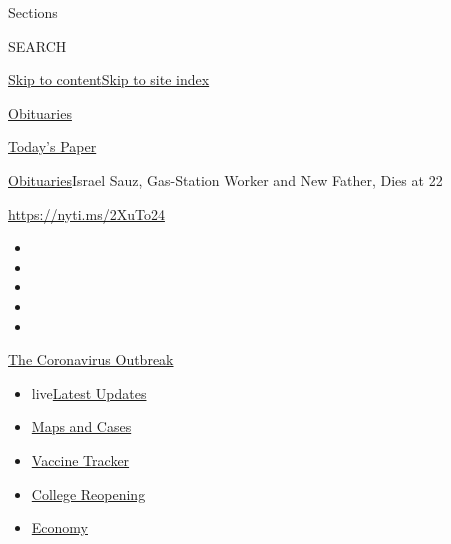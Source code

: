 Sections

SEARCH

\protect\hyperlink{site-content}{Skip to
content}\protect\hyperlink{site-index}{Skip to site index}

\href{https://www.nytimes3xbfgragh.onion/section/obituaries}{Obituaries}

\href{https://myaccount.nytimes3xbfgragh.onion/auth/login?response_type=cookie\&client_id=vi}{}

\href{https://www.nytimes3xbfgragh.onion/section/todayspaper}{Today's
Paper}

\href{/section/obituaries}{Obituaries}\textbar{}Israel Sauz, Gas-Station
Worker and New Father, Dies at 22

\url{https://nyti.ms/2XuTo24}

\begin{itemize}
\item
\item
\item
\item
\item
\end{itemize}

\href{https://www.nytimes3xbfgragh.onion/news-event/coronavirus?action=click\&pgtype=Article\&state=default\&region=TOP_BANNER\&context=storylines_menu}{The
Coronavirus Outbreak}

\begin{itemize}
\tightlist
\item
  live\href{https://www.nytimes3xbfgragh.onion/2020/08/04/world/coronavirus-covid-19.html?action=click\&pgtype=Article\&state=default\&region=TOP_BANNER\&context=storylines_menu}{Latest
  Updates}
\item
  \href{https://www.nytimes3xbfgragh.onion/interactive/2020/us/coronavirus-us-cases.html?action=click\&pgtype=Article\&state=default\&region=TOP_BANNER\&context=storylines_menu}{Maps
  and Cases}
\item
  \href{https://www.nytimes3xbfgragh.onion/interactive/2020/science/coronavirus-vaccine-tracker.html?action=click\&pgtype=Article\&state=default\&region=TOP_BANNER\&context=storylines_menu}{Vaccine
  Tracker}
\item
  \href{https://www.nytimes3xbfgragh.onion/2020/08/02/us/covid-college-reopening.html?action=click\&pgtype=Article\&state=default\&region=TOP_BANNER\&context=storylines_menu}{College
  Reopening}
\item
  \href{https://www.nytimes3xbfgragh.onion/live/2020/08/03/business/stock-market-today-coronavirus?action=click\&pgtype=Article\&state=default\&region=TOP_BANNER\&context=storylines_menu}{Economy}
\end{itemize}

